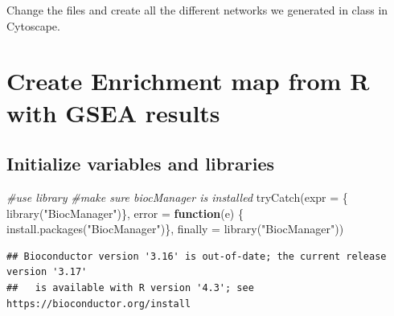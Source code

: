 \documentclass[
]{book}
\newenvironment{Shaded}{\begin{snugshade}}{\end{snugshade}}
\newcommand{\AttributeTok}[1]{\textcolor[rgb]{0.77,0.63,0.00}{#1}}
\newcommand{\CommentTok}[1]{\textcolor[rgb]{0.56,0.35,0.01}{\textit{#1}}}
\newcommand{\ControlFlowTok}[1]{\textcolor[rgb]{0.13,0.29,0.53}{\textbf{#1}}}
\newcommand{\FunctionTok}[1]{\textcolor[rgb]{0.00,0.00,0.00}{#1}}
\newcommand{\NormalTok}[1]{#1}
\newcommand{\StringTok}[1]{\textcolor[rgb]{0.31,0.60,0.02}{#1}}
\begin{document}
Change the files and create all the different networks we generated in class in Cytoscape.

\hypertarget{create-enrichment-map-from-r-with-gsea-results}{%
\chapter{Create Enrichment map from R with GSEA results}\label{create-enrichment-map-from-r-with-gsea-results}}

\hypertarget{initialize-variables-and-libraries-2}{%
\section{Initialize variables and libraries}\label{initialize-variables-and-libraries-2}}

\begin{Shaded}
\begin{Highlighting}[]
\CommentTok{\#use library}
\CommentTok{\#make sure biocManager is installed}
\FunctionTok{tryCatch}\NormalTok{(}\AttributeTok{expr =}\NormalTok{ \{ }\FunctionTok{library}\NormalTok{(}\StringTok{"BiocManager"}\NormalTok{)\}, }
         \AttributeTok{error =} \ControlFlowTok{function}\NormalTok{(e) \{ }
           \FunctionTok{install.packages}\NormalTok{(}\StringTok{"BiocManager"}\NormalTok{)\}, }
         \AttributeTok{finally =} \FunctionTok{library}\NormalTok{(}\StringTok{"BiocManager"}\NormalTok{))}
\end{Highlighting}
\end{Shaded}

\begin{verbatim}
## Bioconductor version '3.16' is out-of-date; the current release version '3.17'
##   is available with R version '4.3'; see https://bioconductor.org/install
\end{verbatim}
\end{document}
